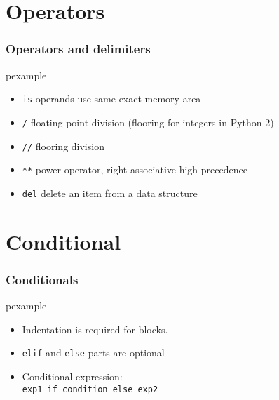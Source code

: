 \documentclass[trans,compress,xcolor=table]{beamer}
\begin{document}
\section{Operators}
\begin{frame}
\frametitle{Operators and delimiters}
\begin{beamercolorbox}{pexample}
\codeoperators
\end{beamercolorbox}
\begin{itemize}
\item \lstinline!is! operands use same exact memory area
\item \lstinline!/! floating point division (flooring for integers in Python 2)
\item \lstinline!//! flooring division
\item \lstinline!**! power operator, right associative high precedence
\item \lstinline!del! delete an item from a data structure
\end{itemize}

\end{frame}


\section{Conditional}

\begin{frame}
\frametitle{Conditionals}
\begin{beamercolorbox}{pexample}
\codecondition
\end{beamercolorbox}
\begin{itemize}
\item Indentation is required for blocks.
\item \lstinline!elif! and \lstinline!else! parts are optional
\item Conditional expression:\\
\lstinline!exp1 if condition else exp2!
\end{itemize}
\end{frame}
\end{document}
